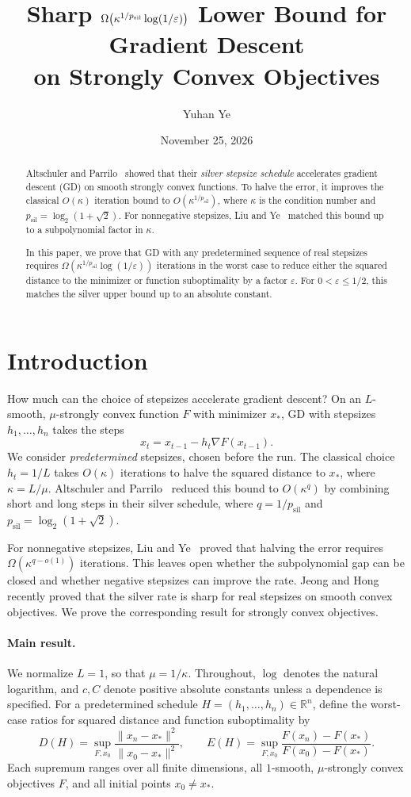 \documentclass[11pt]{article}
\title{Sharp $\Omega\!\left(\kappa^{1/\psil}\log(1/\varepsilon)\right)$ Lower Bound for Gradient Descent\\on Strongly Convex Objectives}
\author{Yuhan Ye}
\date{November 25, 2026}
\makeatletter
\theoremstyle{definition}
\newcommand{\R}{\mathbb R}
\newcommand{\psil}{p_{\mathrm{sil}}}
\renewcommand{\maketitle}{\begin{center}{\LARGE\@title\par}\medskip\@author\par\smallskip\@date\end{center}}
\makeatother
\begin{document}
\maketitle
\begin{abstract}
Altschuler and Parrilo~\cite{AP} showed that their \emph{silver stepsize schedule} accelerates gradient descent (GD) on smooth strongly convex functions. To halve the error, it improves the classical $O(\kappa)$ iteration bound to $O(\kappa^{1/\psil})$, where $\kappa$ is the condition number and $\psil=\log_2(1+\sqrt2)$. For nonnegative stepsizes, Liu and Ye~\cite{LY} matched this bound up to a subpolynomial factor in $\kappa$.

In this paper, we prove that GD with any predetermined sequence of real stepsizes requires $\Omega(\kappa^{1/\psil}\log(1/\varepsilon))$ iterations in the worst case to reduce either the squared distance to the minimizer or function suboptimality by a factor $\varepsilon$. For $0<\varepsilon\le1/2$, this matches the silver upper bound up to an absolute constant.
\end{abstract}

\section{Introduction}\label{sec:intro}
How much can the choice of stepsizes accelerate gradient descent? On an $L$-smooth, $\mu$-strongly convex function $F$ with minimizer $x_*$, GD with stepsizes $h_1,\ldots,h_n$ takes the steps
\[
 x_t=x_{t-1}-h_t\nabla F(x_{t-1}).
\]
We consider \emph{predetermined} stepsizes, chosen before the run. The classical choice $h_t=1/L$ takes $O(\kappa)$ iterations to halve the squared distance to $x_*$, where $\kappa=L/\mu$. Altschuler and Parrilo~\cite{AP} reduced this bound to $O(\kappa^q)$ by combining short and long steps in their silver schedule, where $q=1/\psil$ and $\psil=\log_2(1+\sqrt2)$.

For nonnegative stepsizes, Liu and Ye~\cite{LY} proved that halving the error requires $\Omega(\kappa^{q-o(1)})$ iterations. This leaves open whether the subpolynomial gap can be closed and whether negative stepsizes can improve the rate. Jeong and Hong~\cite{JH} recently proved that the silver rate is sharp for real stepsizes on smooth convex objectives. We prove the corresponding result for strongly convex objectives.

\paragraph{Main result.}
We normalize $L=1$, so that $\mu=1/\kappa$. Throughout, $\log$ denotes the natural logarithm, and $c,C$ denote positive absolute constants unless a dependence is specified. For a predetermined schedule $H=(h_1,\ldots,h_n)\in\R^n$, define the worst-case ratios for squared distance and function suboptimality by
\[
 D(H)=\sup_{F,x_0}\frac{\|x_n-x_*\|^2}{\|x_0-x_*\|^2},
 \qquad E(H)=\sup_{F,x_0}\frac{F(x_n)-F(x_*)}{F(x_0)-F(x_*)}.
\]
Each supremum ranges over all finite dimensions, all $1$-smooth, $\mu$-strongly convex objectives $F$, and all initial points $x_0\ne x_*$.
\end{document}
